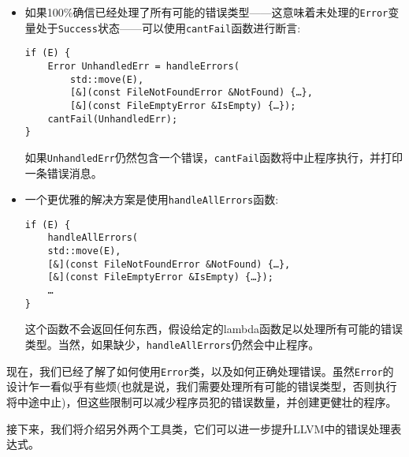 \begin{itemize}
\item 如果100\%确信已经处理了所有可能的错误类型——这意味着未处理的\texttt{Error}变量处于\texttt{Success}状态——可以使用\texttt{cantFail}函数进行断言:

\begin{lstlisting}[style=styleCXX]
if (E) {
	Error UnhandledErr = handleErrors(
		std::move(E),
		[&](const FileNotFoundError &NotFound) {…},
		[&](const FileEmptyError &IsEmpty) {…});
	cantFail(UnhandledErr);
}
\end{lstlisting}

如果\texttt{UnhandledErr}仍然包含一个错误，\texttt{cantFail}函数将中止程序执行，并打印一条错误消息。

\item 一个更优雅的解决方案是使用\texttt{handleAllErrors}函数:

\begin{lstlisting}[style=styleCXX]
if (E) {
	handleAllErrors(
	std::move(E),
	[&](const FileNotFoundError &NotFound) {…},
	[&](const FileEmptyError &IsEmpty) {…});
	…
}
\end{lstlisting}

这个函数不会返回任何东西，假设给定的lambda函数足以处理所有可能的错误类型。当然，如果缺少，\texttt{handleAllErrors}仍然会中止程序。

\end{itemize}

现在，我们已经了解了如何使用\texttt{Error}类，以及如何正确处理错误。虽然\texttt{Error}的设计乍一看似乎有些烦(也就是说，我们需要处理所有可能的错误类型，否则执行将中途中止)，但这些限制可以减少程序员犯的错误数量，并创建更健壮的程序。

接下来，我们将介绍另外两个工具类，它们可以进一步提升LLVM中的错误处理表达式。














